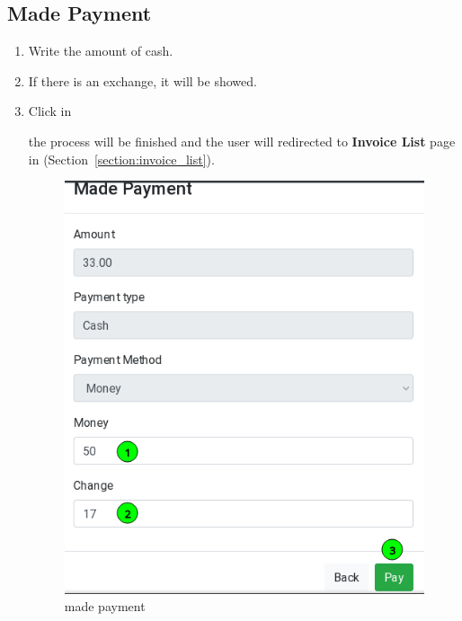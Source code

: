 \documentclass[a4paper,11pt]{refart}
\begin{document}
\subsection{Made Payment}\label{section:made_payment}
\begin{enumerate}
	\item Write the amount of cash.
	\item If there is an exchange, it will be showed.
	\item Click in 
	\medskip
	\begin{leftbar}
		the process will be finished and the user will redirected to \textbf{Invoice List} page in (Section~\ref{section:invoice_list}).
	\end{leftbar}
	\begin{figure}[H]\centering
		\includegraphics[width=\textwidth]{images/sellinvoice-7}
		\caption{made payment}\label{fig:sellinvoice-7}
	\end{figure}
\end{enumerate}
\end{document}
